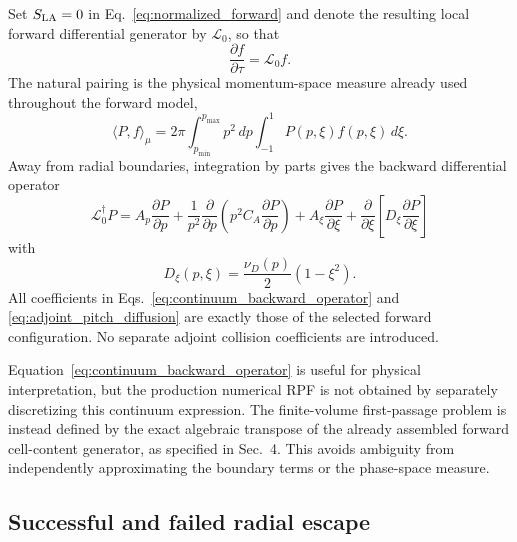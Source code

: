 \documentclass[11pt]{article}
\begin{document}
Set $S_{\rm LA}=0$ in Eq.~\eqref{eq:normalized_forward} and denote the resulting local
forward differential generator by $\mathcal L_0$, so that
\begin{equation}
 \frac{\partial f}{\partial\tau}=\mathcal L_0 f.
 \label{eq:local_forward_generator_continuum}
\end{equation}
The natural pairing is the physical momentum-space measure already used throughout the
forward model,
\begin{equation}
 \langle P,f\rangle_\mu
 =2\pi\int_{p_{\min}}^{p_{\max}}p^2\,dp
      \int_{-1}^{1}P(p,\xi)f(p,\xi)\,d\xi.
 \label{eq:adjoint_weighted_pairing}
\end{equation}
Away from radial boundaries, integration by parts gives the backward differential
operator
\begin{equation}
 \boxed{
 \mathcal L_0^\dagger P
 =A_p\frac{\partial P}{\partial p}
 +\frac{1}{p^2}\frac{\partial}{\partial p}
  \left(p^2C_A\frac{\partial P}{\partial p}\right)
 +A_\xi\frac{\partial P}{\partial\xi}
 +\frac{\partial}{\partial\xi}
  \left[D_\xi\frac{\partial P}{\partial\xi}\right]
 }
 \label{eq:continuum_backward_operator}
\end{equation}
with
\begin{equation}
 D_\xi(p,\xi)=\frac{\nu_D(p)}{2}(1-\xi^2).
 \label{eq:adjoint_pitch_diffusion}
\end{equation}
All coefficients in Eqs.~\eqref{eq:continuum_backward_operator} and
\eqref{eq:adjoint_pitch_diffusion} are exactly those of the selected forward
configuration.  No separate adjoint collision coefficients are introduced.

Equation~\eqref{eq:continuum_backward_operator} is useful for physical interpretation,
but the production numerical RPF is not obtained by separately discretizing this
continuum expression.  The finite-volume first-passage problem is instead defined by the
exact algebraic transpose of the already assembled forward cell-content generator, as
specified in Sec.~4.  This avoids ambiguity from independently approximating the
boundary terms or the phase-space measure.

\subsection{Successful and failed radial escape}
\label{sec:rpf_boundary_semantics}
\end{document}

